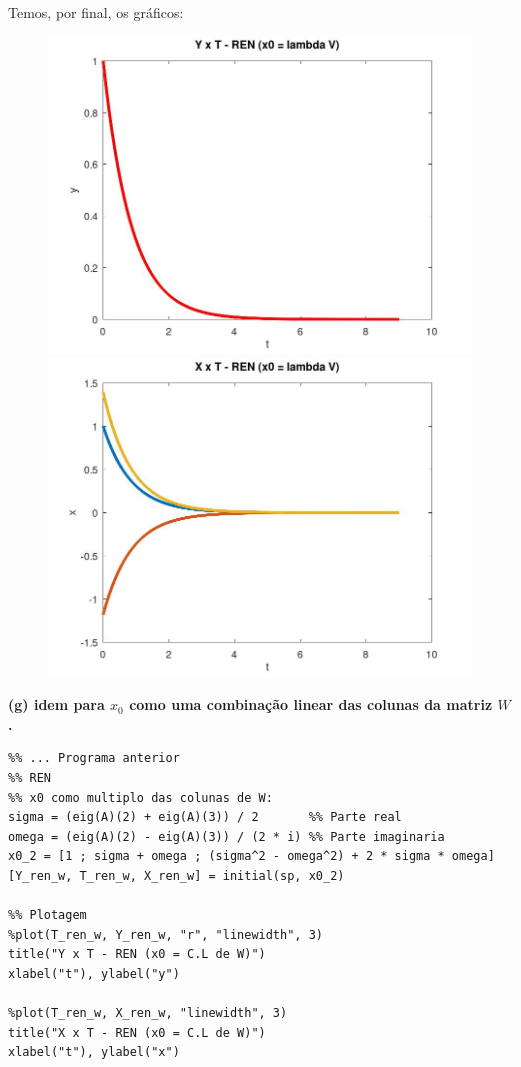 \documentclass[11pt]{article}
\begin{document}
Temos, por final, os gráficos:
\begin{center}
  \begin{figure}[h]
  \begin{minipage}[!]{0.5\linewidth}
    \includegraphics[scale=0.3]{plot1f1.jpg}
  \end{minipage}
  \begin{minipage}[!]{0.5\linewidth}
    \includegraphics[scale=0.3]{plot1f2.jpg}
  \end{minipage}
  \end{figure}
\end{center}
\textbf{(g) idem para $x_0$ como uma combinação linear das colunas da matriz $W$.}

\begin{verbatim}
%% ... Programa anterior
%% REN
%% x0 como multiplo das colunas de W:
sigma = (eig(A)(2) + eig(A)(3)) / 2       %% Parte real
omega = (eig(A)(2) - eig(A)(3)) / (2 * i) %% Parte imaginaria
x0_2 = [1 ; sigma + omega ; (sigma^2 - omega^2) + 2 * sigma * omega]
[Y_ren_w, T_ren_w, X_ren_w] = initial(sp, x0_2)

%% Plotagem
%plot(T_ren_w, Y_ren_w, "r", "linewidth", 3)
title("Y x T - REN (x0 = C.L de W)")
xlabel("t"), ylabel("y")

%plot(T_ren_w, X_ren_w, "linewidth", 3)
title("X x T - REN (x0 = C.L de W)")
xlabel("t"), ylabel("x")
\end{verbatim}
\end{document}
